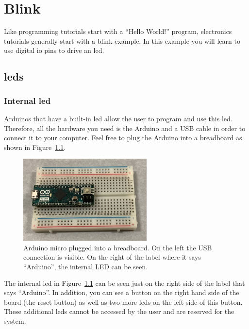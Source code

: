 
\chapter{Blink}

Like programming tutorials start with a ``Hello World!'' program, electronics tutorials generally start with a blink example. In this example you will learn to use digital \ac{io} pins to drive an \ac{led}. 

\section{\acp{led}}

\subsection{Internal \ac{led}}

Arduinos that have a built-in \ac{led} allow the user to program and use this \ac{led}. Therefore, all the hardware you need is the Arduino and a USB cable in order to connect it to your computer. Feel free to plug the Arduino into a breadboard as shown in Figure~\ref{fig:blink:arduino_alone}.
\begin{figure}[htb]
    \centering
    \includegraphics[width=0.6\textwidth]{graphics/01_blink/arduino_alone.jpg}
    \caption{Arduino micro plugged into a breadboard. On the left the USB connection is visible. On the right of the label where it says ``Arduino'', the internal LED can be seen.}
    \label{fig:blink:arduino_alone}
\end{figure}
The internal \ac{led} in Figure~\ref{fig:blink:arduino_alone} can be seen just on the right side of the label that says ``Arduino''. In addition, you can see a button on the right hand side of the board (the reset button) as well as two more \acp{led} on the left side of this button. These additional \acp{led} cannot be accessed by the user and are reserved for the system.

